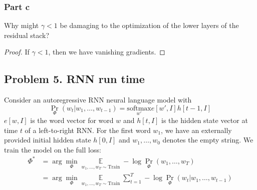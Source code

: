 \documentclass{amsart}
\DeclareMathOperator{\ee}{\mathbb{E}}
\theoremstyle{definition}
\begin{document}
\subsubsection*{Part c}
Why might $\gamma < 1$ be damaging to the optimization of the lower layers of the residual stack?
\begin{proof}
  If $\gamma < 1$, then we have vanishing gradients.
\end{proof}

\subsection*{Problem 5. RNN run time} Consider an autoregressive RNN neural language model with 
\[
\Pr_\Phi (w_t | w_1, \ldots, w_{t - 1}) = \underset{w'}{\mathrm{softmax}} e[w', I] h[t - 1, I]
\]
$e[w, I]$ is the word vector for word $w$ and $h[t, I]$ is the hidden state vector at time $t$ of a left-to-right RNN.
For the first word $w_1$, we have an externally provided initial hidden state $h[0, I]$ and $w_1, \ldots, w_0$ denotes the empty string. 
We train the model on the full loss:
\begin{align*}
  \Phi^\ast &= \arg\min_\Phi \underset{w_1, \ldots, w_T \sim \mathrm{Train}}{\ee} - \log \Pr_\Phi(w_1, \ldots, w_T) \\
  &= \arg\min_\Phi \underset{w_1, \ldots, w_T \sim \mathrm{Train}}{\ee} \sum_{t = 1}^T - \log \Pr_\Phi(w_t | w_1, \ldots, w_{t - 1})
\end{align*}
\end{document}
